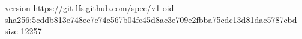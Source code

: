 version https://git-lfs.github.com/spec/v1
oid sha256:5cddb813e748ec7e74c567b04fc45d8ac3e709e2fbba75cdc13d81dac5787cbd
size 12257
